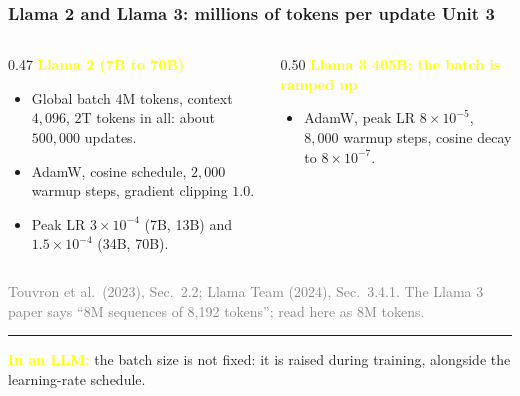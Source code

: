 \documentclass[12pt]{beamer}
\newcommand{\FrameTitle}[2]{\frametitle{#1 \hfill \small\textnormal{\textcolor{midgray}{#2}}}}
\begin{document}
\begin{frame}\FrameTitle{Llama 2 and Llama 3: millions of tokens per update}{Unit 3}
\begin{columns}[T]
\begin{column}{0.47\linewidth}
  \textcolor{yellow}{\textbf{Llama 2 (7B to 70B)}}
  \begin{itemize}\footnotesize\setlength{\itemsep}{1.2mm}
    \item Global batch $4$M tokens, context $4{,}096$, $2$T tokens in all: about $500{,}000$ updates.
    \item AdamW, cosine schedule, $2{,}000$ warmup steps, gradient clipping $1.0$.
    \item Peak LR $3\times10^{-4}$ (7B, 13B) and $1.5\times10^{-4}$ (34B, 70B).
  \end{itemize}
\end{column}
\begin{column}{0.50\linewidth}
  \textcolor{yellow}{\textbf{Llama 3 405B: the batch is ramped up}}
  \vspace{1mm}
  \begin{itemize}\footnotesize\setlength{\itemsep}{1.2mm}
    \item AdamW, peak LR $8\times10^{-5}$, $8{,}000$ warmup steps, cosine decay to $8\times10^{-7}$.
  \end{itemize}
\end{column}
\end{columns}
{\par\vspace{1mm}\footnotesize\textcolor{gray}{Touvron et al.\ (2023), Sec.\ 2.2; Llama Team (2024), Sec.\ 3.4.1. The Llama 3 paper says ``8M sequences of 8,192 tokens''; read here as $8$M tokens.}\par}
\vfill
{\color{yellow}\rule{\linewidth}{0.5pt}}\par\vspace{1mm}
{\raggedright\small\textcolor{yellow}{\textbf{In an LLM:}} the batch size is not fixed: it is raised during training, alongside the learning-rate schedule.\par}
\end{frame}
\end{document}
